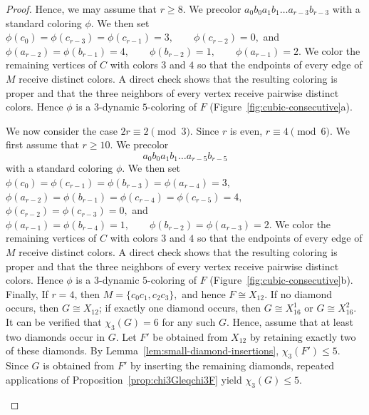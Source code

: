 \documentclass[10pt,a4paper]{article}
\providecommand{\tikzsetnextfilename}[1]{}
\theoremstyle{case}
\numberwithin{subcase}{case}
\begin{document}
\begin{proof}
Hence, we may assume that $r\geq8$. We precolor
$
a_0b_0a_1b_1\ldots a_{r-3}b_{r-3}
$
with a standard coloring $\phi$. We then set
$
\phi(c_0)=\phi(c_{r-3})=\phi(c_{r-1})=3,
\qquad
\phi(c_{r-2})=0,
$
and
$
\phi(a_{r-2})=\phi(b_{r-1})=4,\qquad
\phi(b_{r-2})=1,\qquad
\phi(a_{r-1})=2.
$
We color the remaining vertices of $C$ with colors $3$ and $4$ so that
the endpoints of every edge of $M$ receive distinct colors.
A direct check shows that the resulting coloring is proper and that the
three neighbors of every vertex receive pairwise distinct colors.
Hence $\phi$ is a $3$-dynamic $5$-coloring of $F$
(Figure~\ref{fig:cubic-consecutive}a).

We now consider the case $2r\equiv2\pmod3$. Since $r$ is even,
$r\equiv4\pmod6$. We first assume that $r\geq10$.
We precolor
\[
a_0b_0a_1b_1\ldots a_{r-5}b_{r-5}
\]
with a standard coloring $\phi$. We then set
$
\phi(c_0)=\phi(c_{r-1})=\phi(b_{r-3})
=\phi(a_{r-4})=3,
$
$
\phi(a_{r-2})=\phi(b_{r-1})
=\phi(c_{r-4})=\phi(c_{r-5})=4,
$
$
\phi(c_{r-2})=\phi(c_{r-3})=0,
$ and
$
\phi(a_{r-1})=\phi(b_{r-4})=1,
\qquad
\phi(b_{r-2})=\phi(a_{r-3})=2.
$
We color the remaining vertices of $C$ with colors $3$ and $4$ so that
the endpoints of every edge of $M$ receive distinct colors.
A direct check shows that the resulting coloring is proper and that the
three neighbors of every vertex receive pairwise distinct colors.
Hence $\phi$ is a $3$-dynamic $5$-coloring of $F$
(Figure~\ref{fig:cubic-consecutive}b).
Finally, If $r=4$, then
$
M=\{c_0c_1,c_2c_3\},
$
and hence $F\cong X_{12}$. If no diamond occurs, then
$G\cong X_{12}$; if exactly one diamond occurs, then
$G\cong X_{16}^1$ or $G\cong X_{16}^2$. It can be verified that $\chi_3(G)=6$ for any such $G$. Hence, assume that at least two diamonds occur in $G$.
Let $F'$ be obtained from $X_{12}$ by retaining exactly two of these
diamonds. By Lemma~\ref{lem:small-diamond-insertions},
$\chi_3(F')\leq5$. Since $G$ is obtained from $F'$ by inserting the
remaining diamonds, repeated applications of
Proposition~\ref{prop:chi3Gleqchi3F} yield $\chi_3(G)\leq5$.


\begin{figure}[H]
    \centering

    \begin{subfigure}{0.48\textwidth}
        \centering


\tikzsetnextfilename{fig-cubic-consecutive-1}
\begin{tikzpicture}[scale=1,
    vertex/.style={circle, fill=black, inner sep=2pt}
]


\end{tikzpicture}
\end{subfigure}
\end{figure}
\end{proof}
\end{document}
